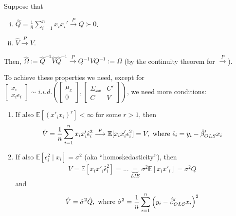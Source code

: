 \documentclass[11pt]{elegantbook}
\begin{document}
\begin{proposition}
    Suppose that
    \begin{enumerate}[(i).]
        \item $\hat{Q}=\frac{1}{n}\sum_{i=1}^n x_ix_i' \stackrel{P}{\longrightarrow} Q\succ 0$.
        \item $\hat{V} \stackrel{P}{\longrightarrow} V$.
    \end{enumerate}
    Then, $\hat{\Omega}:=\hat{Q}^{-1}\hat{V}\hat{Q}^{-1}\stackrel{P}{\longrightarrow} Q^{-1}VQ^{-1}:=\Omega$ (by the continuity theorem for $\stackrel{P}{\longrightarrow}$).
\end{proposition}
\begin{remark}
    To achieve these properties we need, except for $\begin{bmatrix}
        x_i\\
        x_i\epsilon_i
    \end{bmatrix}\sim i.i.d. \left(\begin{bmatrix}
        \mu_x\\
        0
    \end{bmatrix},\begin{bmatrix}
        \Sigma_{xx}&	C'\\
        C & V
    \end{bmatrix}\right)$, we need more conditions:
    \begin{enumerate}
        \item If also $\mathbb{E}[(x'_ix_i)^r]<\infty$ for some $r>1$, then
        \begin{equation}
            \begin{aligned}
                \hat{V}=\frac{1}{n}\sum_{i=1}^n x_ix'_i \hat{\epsilon}_i^2 \stackrel{P}{\longrightarrow} \mathbb{E}[x_ix'_i \epsilon_i^2]=V, \textnormal{ where } \hat{\epsilon}_i=y_i-\hat{\beta}'_{OLS}x_i
            \end{aligned}
            \nonumber
        \end{equation}
        \item If also $\mathbb{E}[\epsilon^2_i\mid x_i]=\sigma^2$ (aka ``homoskedasticity''), then
        \begin{equation}
            \begin{aligned}
                V=\mathbb{E}[x_ix'_i \hat{\epsilon}_i^2]=...\underbrace{=}_{LIE} \sigma^2 \mathbb{E}[x_ix'_i]=\sigma^2 Q
            \end{aligned}
            \nonumber
        \end{equation}
        and
        \begin{equation}
            \begin{aligned}
                \hat{V}=\hat{\sigma}^2\hat{Q}, \textnormal{ where }\hat{\sigma}^2=\frac{1}{n}\sum_{i=1}^n \left(y_i-\hat{\beta}'_{OLS}x_i\right)^2
            \end{aligned}
            \nonumber
        \end{equation}
    \end{enumerate}
\end{remark}
\end{document}
